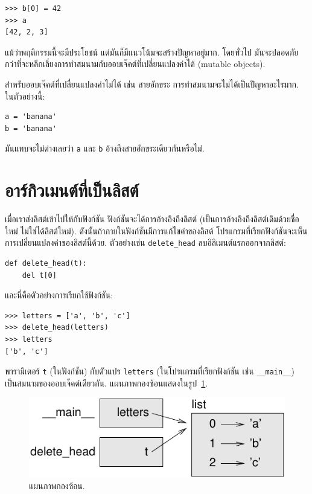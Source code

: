 \begin{verbatim}
>>> b[0] = 42
>>> a
[42, 2, 3]
\end{verbatim}
%
แม้ว่าพฤติกรรมนี้จะมีประโยชน์
แต่มันก็มีแนวโน้มจะสร้างปัญหาอยู่มาก.
โดยทั่วไป มันจะปลอดภัยกว่าที่จะหลีกเลี่ยงการทำสมนามกับออบเจ๊คต์ที่เปลี่ยนแปลงค่าได้ (mutable objects).

สำหรับออบเจ๊คต์ที่เปลี่ยนแปลงค่าไม่ได้ เช่น สายอักขระ
การทำสมนามจะไม่ได้เป็นปัญหาอะไรมาก.
ในตัวอย่างนี้:

\begin{verbatim}
a = 'banana'
b = 'banana'
\end{verbatim}
%
มันแทบจะไม่ต่างเลยว่า \texttt{a} และ \texttt{b} อ้างถึงสายอักขระเดียวกันหรือไม่.

\section{อาร์กิวเมนต์ที่เป็นลิสต์}
\label{list.arguments}

เมื่อเราส่งลิสต์เข้าไปให้กับฟังก์ชัน
ฟังก์ชันจะได้การอ้างอิงถึงลิสต์ (เป็นการอ้างอิงถึงลิสต์เดิมด้วยชื่อใหม่ ไม่ใช่ได้ลิสต์ใหม่).
ดังนั้นถ้าภายในฟังก์ชันมีการแก้ไขค่าของลิสต์
โปรแกรมที่เรียกฟังก์ชันจะเห็นการเปลี่ยนแปลงค่าของลิสต์นี้ด้วย.
ตัวอย่างเช่น \verb|delete_head| ลบอิลิเมนต์แรกออกจากลิสต์:

\begin{verbatim}
def delete_head(t):
    del t[0]
\end{verbatim}
%
และนี่คือตัวอย่างการเรียกใช้ฟังก์ชัน:
%
\begin{verbatim}
>>> letters = ['a', 'b', 'c']
>>> delete_head(letters)
>>> letters
['b', 'c']
\end{verbatim}
%
พารามิเตอร์ \texttt{t} (ในฟังก์ชัน) กับตัวแปร \texttt{letters} (ในโปรแกรมที่เรียกฟังก์ชัน เช่น \verb|__main__|) เป็นสมนามของออบเจ๊คต์เดียวกัน.
แผนภาพกองซ้อนแสดงในรูป~\ref{fig.stack5}.

\begin{figure}
\centerline
{\includegraphics[scale=0.8]{figs/stack5.pdf}}
\caption{แผนภาพกองซ้อน.}
\label{fig.stack5}
\end{figure}

